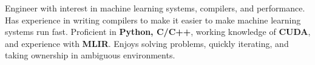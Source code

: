 \vspace{-1.0em}
\begin{cventries}
  \vspace{-1.0em}
  \cventry
    {}
    {}
    {}
    {}
    {		
		Engineer with interest in machine learning systems, compilers, and performance. Has experience in writing compilers to make it easier to make machine learning systems run fast.
		Proficient in \textbf{Python, C/C++}, working knowledge of \textbf{CUDA}, and experience with \textbf{MLIR}. Enjoys solving problems, quickly iterating, and taking ownership in ambiguous environments. 
    }

\end{cventries}